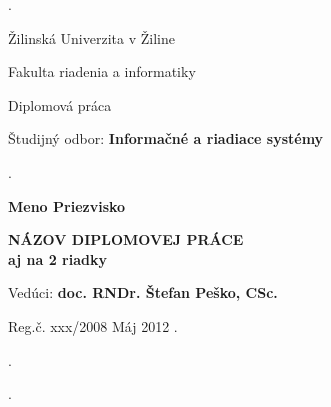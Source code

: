 \begin{titlepage}
\phantom.

\bigskip

\begin{center}
{\sc\LARGE Žilinská Univerzita v Žiline}
\medskip

{\sc\Large Fakulta riadenia a informatiky}

\vfill\vfill\vfill\vfill

{\sc\LARGE Diplomová práca}

\medskip

{\large Študijný odbor: {\bf Informačné a riadiace systémy}}
\end{center}


\vfill\vfill\vfill\vfill


\phantom.\hfill
\begin{minipage}{10cm}
\begin{center}
{\large\bf Meno Priezvisko}

\medskip

{\large\bf NÁZOV DIPLOMOVEJ PRÁCE \\   
aj na 2 riadky}

\medskip

Vedúci: {\bf doc. RNDr. Štefan Peško, CSc.}

\medskip
 
\hfill
Reg.č. xxx/2008 
\hfill
Máj 2012
\hfill\phantom.
\end{center}
\end{minipage}
\hspace{1.7cm}\phantom.

\vspace{2.9cm}

\phantom.
\end{titlepage}



\begin{abstract}

\noindent
{\sc Priezvisko Meno:} {\em Názov diplomovej práce}
[Diplomová práca] 

\noindent
Žilinská Univerzita v~Žiline,  
Fakulta riadenia a informatiky,  
Katedra matematických metód.

\noindent  
Vedúci: doc. RNDr. Štefan Peško, CSc. 
 
\noindent  
Stupeň odbornej kvalifikácie:
Inžinier v~odbore .... Žilina. 

\noindent
FRI ŽU v~Žiline, 2012 --- ?? s.

\bigskip

Obsahom práce je...


\end{abstract}


